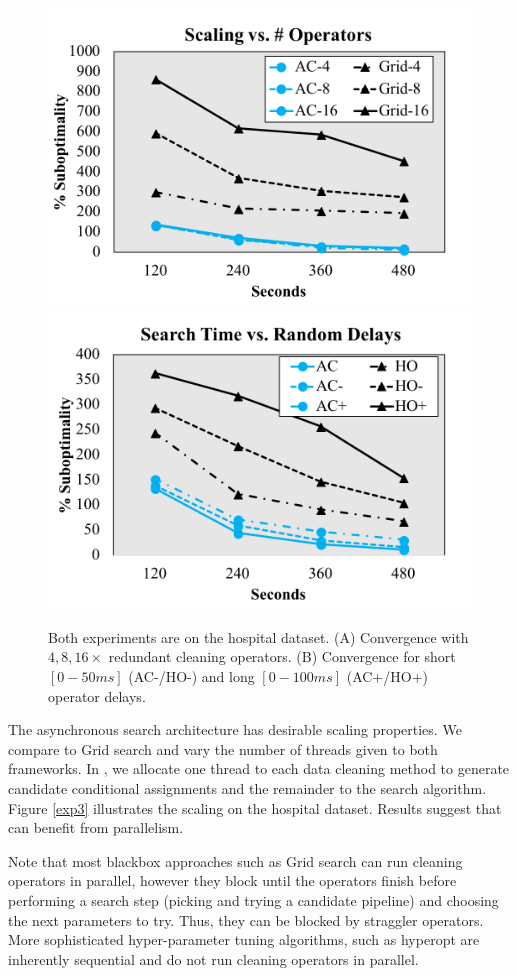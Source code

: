 \begin{figure}[t]
\centering
 \includegraphics[width=0.8\columnwidth]{exp/exp5.png}
 \includegraphics[width=0.8\columnwidth]{exp/exp4.png}
 \caption{Both experiments are on the hospital dataset. (A) Convergence with $4, 8, 16\times$ redundant cleaning operators. (B) Convergence for short $[0-50ms]$ (AC-/HO-) and long $[0-100ms]$ (AC+/HO+) operator delays. \label{exp45}}
\end{figure}

The asynchronous search architecture has desirable scaling properties.
We compare to Grid search and vary the number of threads given to both frameworks.
In \sys, we allocate one thread to each data cleaning method to generate candidate conditional assignments and the remainder to the search algorithm.
Figure \ref{exp3} illustrates the scaling on the hospital dataset.
Results suggest that \sys can benefit from parallelism.

Note that most blackbox approaches such as Grid search can run cleaning operators in parallel, however they block until the operators finish before performing a search step (picking and trying a candidate pipeline) and choosing the next parameters to try.  Thus, they can be blocked by straggler operators.  More sophisticated hyper-parameter tuning algorithms, such as hyperopt are inherently sequential and do not run cleaning operators in parallel.  



